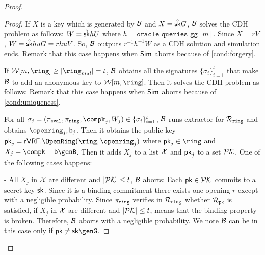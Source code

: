 \begin{proof}
\begin{proof}
			If $ X  $ is a key which is generated by $ \mathcal{B} $ and $ X = \hat{\mathsf{sk}}G $, $ \mathcal{B} $ solves the CDH problem as follows: $ W = \hat{\mathsf{sk}} h U $ where $ h = \mathtt{oracle\_queries\_gg}[m] $. Since $ X = r V $, $ W = \hat{\mathsf{sk}}huG =rhuV $. So, $ \mathcal{B} $ outputs $ r^{-1}h^{-1}W $ as a CDH solution and simulation ends. Remark that this case happens when $ \mathsf{Sim} $ aborts because of \ref{cond:forgery}.
			
			If $ \anonymouskeylist[m,\ring] \geq |\ring_{mal}| =t$, $ \mathcal{B} $ obtains all the signatures $ \{\sigma_i\}_{i =1}^t $ that make $ \mathcal{B} $ to add an anonymous key to $ \anonymouskeylist[m,\ring] $. Then it solves the CDH problem as follows: Remark that this case happens when $ \mathsf{Sim} $ aborts because of \ref{cond:uniqueness}.
			
			For all $ \sigma_j = (\pieval,\piring,\compk_j,W_j) \in \{\sigma_i\}_{i =1}^t $, $ \mathcal{B} $ runs extractor for $ \mathcal{R}_{\mathtt{ring}} $ and obtains $\openring_j, \openpk_j$. Then it obtains the public key $ \pk_j = \rVRF.\OpenRing(\ring, \openring_j) $ where $ \pk_j \in \ring $ and  $ X_j = \compk- \openpk \genB $. Then it adds $ X_j $ to a list $ {\mathcal{X}}  $ and $ \mathsf{pk}_j $ to a set $ {\mathcal{PK}} $. One of the following cases happens:
			
		
			- All $ X_j $ in $ {\mathcal{X}} $ are different and $ |{\mathcal{PK}}| \leq t $, $ \mathcal{B} $ aborts: Each $ \mathsf{pk} \in {\ensuremath{\mathcal{PK}}} $ commits to a secret key $ \mathsf{sk} $. Since it is a binding commitment there exists one opening $ r $ except with a negligible probability. Since $ \pi_{\mathtt{ring}} $ verifies in $ \mathcal{R}_{\mathtt{ring}} $ whether $ \mathcal{R}_{\mathsf{pk}} $ is satisfied, if  $ X_j $ in $ {\mathcal{X}} $ are different and $ |{\mathcal{PK}}| \leq t $, means that the binding property is broken. Therefore, $ \mathcal{B}  $ aborts with a negligible probability. We note $ \mathcal{B} $ can be in this case only if $ \pk \neq \sk \genG $.
			

\end{proof}
\end{proof}
